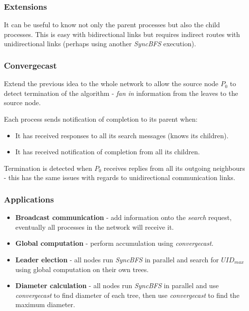 \documentclass[11pt]{article}
\begin{document}
\subsubsection{Extensions}
It can be useful to know not only the parent processes but also the child processes.
This is easy with bidirectional links but requires indirect routes with unidirectional links (perhaps using another \textit{SyncBFS} execution).

\subsubsection{Convergecast}
Extend the previous idea to the whole network to allow the source node $P_0$ to detect termination of the algorithm - \textit{fan in} information from the leaves to the source node.

Each process sends notification of completion to its parent when:
\begin{itemize}
  \item It has received responses to all its search messages (knows its children).
  \item It has received notification of completion from all its children.
\end{itemize}

Termination is detected when $P_0$ receives replies from all its outgoing neighbours - this has the same issues with regards to unidirectional communication links.

\subsubsection{Applications}
\begin{itemize}
  \item \textbf{Broadcast communication} - add information onto the \textit{search} request, eventually all processes in the network will receive it.
  \item \textbf{Global computation} - perform accumulation using \textit{convergecast}.
  \item \textbf{Leader election} - all nodes run \textit{SyncBFS} in parallel and search for $UID_{max}$ using global computation on their own trees.
  \item \textbf{Diameter calculation} - all nodes run \textit{SyncBFS} in parallel and use  \textit{convergecast} to find diameter of each tree, then use \textit{convergecast} to find the maximum diameter.
\end{itemize}
\end{document}
